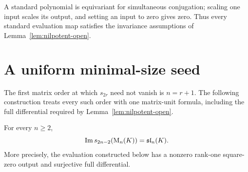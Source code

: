 A standard polynomial is equivariant for simultaneous conjugation;
scaling one input scales its output, and setting an input to zero
gives zero. Thus every standard evaluation map satisfies the
invariance assumptions of Lemma~\ref{lem:nilpotent-open}.

\section{A uniform minimal-size seed}\label{sec:even-seed}
The first matrix order at which $s_{2r}$ need not vanish is
$n=r+1$. The following construction treats every such order with
one matrix-unit formula, including the full differential required
by Lemma~\ref{lem:nilpotent-open}.

\begin{theorem}\label{thm:even-seed}
For every $n\ge2$,
\begin{equation}\label{eq:even-seed}
 \operatorname{Im} s_{2n-2}(\mathrm{M}_n(K))=\mathfrak{sl}_n(K).
\end{equation}
More precisely, the evaluation constructed below has a nonzero
rank-one square-zero output and surjective full differential.
\end{theorem}
